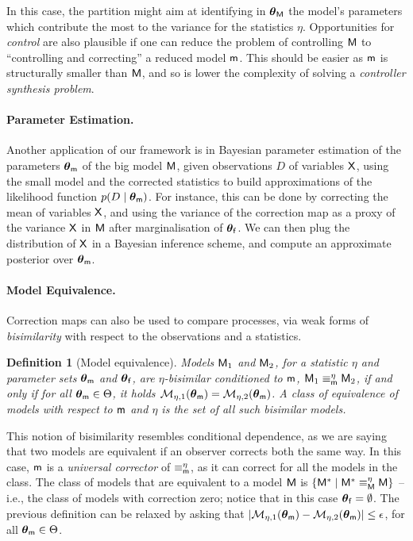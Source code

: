 \documentclass[runningheads,a4paper]{llncs}
\newtheorem{mydef}{Definition}
\newcommand{\bM}{{\sf{M}}}
\newcommand{\bm}{{\sf{m}}}
\newcommand{\cvar}{{\sf{X}}}
\newcommand{\pfpar}{\bth_{\sf{f}}}
\newcommand{\pmpar}{\bth_{\sf{m}}}
\newcommand{\pMpar}{\bth_{\sf{M}}}
\newcommand{\tstat}{\eta} %
\newcommand{\bth}{\boldsymbol{\theta}}
\newcommand{\tmapi}[1]{{\cal M}_{\tstat,#1}}
\begin{document}
In this case, the partition might aim at identifying in $\pMpar$  the model's parameters which contribute the most  to the  variance for the statistics $\tstat$. 
Opportunities for {\em control} are also plausible if one can reduce the problem of controlling $\bM$ to ``controlling and correcting'' a reduced model $\bm$. This should be easier as $\bm$ is structurally smaller than $\bM$, and so is lower the complexity of solving a {\em controller synthesis problem}.

\paragraph{Parameter Estimation.} 
Another application of our framework is in Bayesian parameter estimation of the parameters $\pmpar$ of the big model $\bM$, given observations $D$ of variables $\cvar$, using the small model and the corrected statistics to build approximations of the likelihood function $p(D\mid \pmpar)$. For  instance, this can be done by correcting the mean of variables $\cvar $, and using the variance of the correction map as a proxy of the variance $\cvar$ in $\bM$ after marginalisation of $\pfpar$. We can then plug the distribution of $\cvar$  in  a Bayesian inference scheme,  and compute an approximate posterior over $\pmpar$.

\paragraph{Model Equivalence.} Correction maps can also be used to compare processes, via weak forms of  {\em bisimilarity} with respect to the observations and a statistics. \begin{mydef}[Model equivalence] Models $\bM_1$ and $\bM_2$, for a statistic $\tstat$ and parameter sets $\pmpar$ and $\pfpar$, are {\em $\tstat$-bisimilar conditioned to $\bm$},  $\bM_1\equiv_{\bm}^{\tstat} \bM_2$, if and only if for all $\pmpar\in \Theta$, it holds $\tmapi{1}(\pmpar) = \tmapi{2}(\pmpar)$. A class of equivalence of models  with respect to $\bm$ and $\tstat$ is the set of all such bisimilar models.
\end{mydef}
This notion of bisimilarity resembles conditional dependence, as  we are saying that two models are equivalent if  an observer    corrects both the same way.  In this case, $\bm$ is a {\em universal corrector} of $\equiv_{\bm}^{\tstat}$, as it can correct for all the models in the class. The class of models that are equivalent to a model $\bM$ is $\{ \bM^\ast \mid  \bM^\ast \equiv_{\bM}^{\tstat}  \bM\}$ -- i.e.,  the class of models with  correction zero; notice that in this case $\pfpar=\emptyset$.  The previous definition can be relaxed by asking that $|\tmapi{1}(\pmpar) - \tmapi{2}(\pmpar)|\leq \epsilon$,  for all $\pmpar\in \Theta$.
\end{document}
